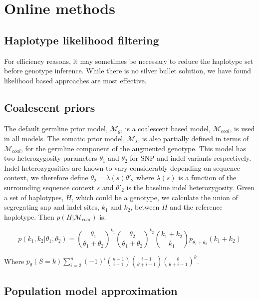 \documentclass[notitlepage, twocolumn]{article}
\begin{document}



\section*{Online methods}

\subsection*{Haplotype likelihood filtering}

For efficiency reasons, it may sometimes be necessary to reduce the haplotype set before genotype inference. While there is no silver bullet solution, we have found likelihood based approaches are most effective.

\subsection*{Coalescent priors}

The default germline prior model, $\mathcal{M}_{g}$, is a coalescent based model, $\mathcal{M}_{coal}$, is used in all models. The somatic prior model, $\mathcal{M}_s$, is also partially defined in terms of $\mathcal{M}_{coal}$, for the germline component of the augmented genotype. This model has two heterozygosity parameters $\theta_{1}$ and $\theta_{2}$ for SNP and indel variants respectively. Indel heterozygosities are known to vary considerably depending on sequence context, we therefore define $\theta_{2} = \lambda(s) \theta'_{2}$ where $\lambda(s)$ is a function of the surrounding sequence context $s$ and $\theta'_{2}$ is the baseline indel heterozygosity. Given a set of haplotypes, $H$, which could be a genotype, we calculate the union of segregating snp and indel sites, $k_{1}$ and $k_{2}$, between $H$ and the reference haplotype. Then $p(H | \mathcal{M}_{coal})$ is:

\begin{equation*}
    p(k_{1}, k_{2} |  \theta_{1}, \theta_{2}) = \binom{\theta_{1}}{\theta_{1} + \theta_{2}}^{k_1} \binom{\theta_{2}}{\theta_{1} + \theta_{2}}^{k_{2}} \binom{k_{1} + k_{2}}{k_{1}} p_{\theta_{1} + \theta_{2}} (k_{1} + k_{2})
\end{equation*}

Where $p_\theta(S = k)\sum_{i=2}^n (-1)^i \binom{n - 1}{i - 1} \binom{i - 1}{\theta + i - 1} \binom{\theta}{\theta + i - 1}^k$.

\subsection*{Population model approximation}
\end{document}
